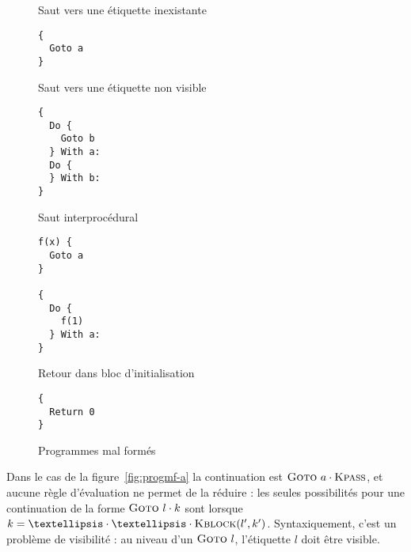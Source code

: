 \begin{figure} %
    \centering

\begin{SubFloat}{\label{fig:progmf-a}Saut vers une étiquette inexistante}
\begin{minipage}[b]{0.4\linewidth}
\begin{Verbatim}
{
  Goto a
}
\end{Verbatim}
\end{minipage}
\end{SubFloat}
\begin{SubFloat}{\label{fig:progmf-b}Saut vers une étiquette non visible}
\begin{minipage}[b]{0.4\linewidth}
\begin{Verbatim}
{
  Do {
    Goto b
  } With a:
  Do {
  } With b:
}
\end{Verbatim}
\end{minipage}
\end{SubFloat}

\vspace{1cm}

\begin{SubFloat}{\label{fig:progmf-c}Saut interprocédural}
\begin{minipage}[b]{0.4\linewidth}
\begin{Verbatim}
f(x) {
  Goto a
}

{
  Do {
    f(1)
  } With a:
}
\end{Verbatim}
\end{minipage}
\end{SubFloat}
\begin{SubFloat}{\label{fig:progmf-d}Retour dans bloc d'initialisation}
\begin{minipage}[b]{0.4\linewidth}
\begin{Verbatim}
{
  Return 0
}
\end{Verbatim}
\end{minipage}
\end{SubFloat}

  \caption{Programmes mal formés}
  \label{fig:progmf}
\end{figure} %

Dans le cas de la figure~\ref{fig:progmf-a} la continuation est $\textsc{Goto}~a
\cdot \textsc{Kpass}$, et aucune règle d'évaluation ne permet de la réduire : les seules
possibilités pour une continuation de la forme $\textsc{Goto}~l \cdot k$ sont
lorsque $k = … \cdot … \cdot \kBlock{l'}{k'}$. Syntaxiquement, c'est un problème
de visibilité : au niveau d'un $\textsc{Goto}~l$, l'étiquette $l$ doit être visible.


